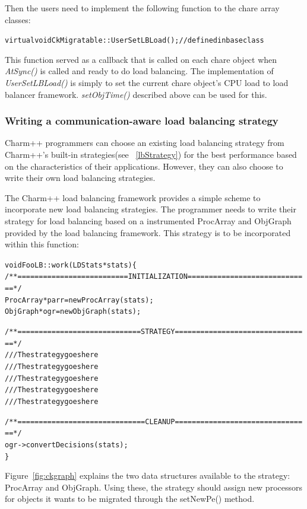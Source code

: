 Then the users need to implement the following function to the chare array
classes:

\begin{alltt}
   virtual void CkMigratable::UserSetLBLoad();      // defined in base class
\end{alltt}

This function served as a callback that is called on each chare object when
{\em AtSync()} is called and ready to do load balancing. The implementation of
{\em UserSetLBLoad()} is simply to set the current chare object's CPU load to
load balancer framework. {\em setObjTime()} described above can be used for
this.

\subsubsection{Writing a communication-aware load balancing strategy}

Charm++ programmers can choose an existing load balancing strategy from
Charm++'s built-in strategies(see ~\ref{lbStrategy}) for the best performance
based on the characteristics of their applications. However, they can also
choose to write their own load balancing strategies.

The Charm++ load balancing framework provides a simple scheme to incorporate
new load balancing strategies. The programmer needs to write their strategy for
load balancing based on a instrumented ProcArray and ObjGraph provided by the
load balancing framework. This strategy is to be incorporated within this
function:

\begin{alltt}
void FooLB::work(LDStats *stats) \{
  /** ========================== INITIALIZATION ============================= */
  ProcArray *parr = new ProcArray(stats);
  ObjGraph *ogr = new ObjGraph(stats);

  /** ============================= STRATEGY ================================ */
  /// The strategy goes here
  /// The strategy goes here
  /// The strategy goes here
  /// The strategy goes here
  /// The strategy goes here

  /** ============================== CLEANUP ================================ */
  ogr->convertDecisions(stats);
\}
\end{alltt}

Figure~\ref{fig:ckgraph} explains the two data structures available to the
strategy: ProcArray and ObjGraph. Using these, the strategy should assign new
processors for objects it wants to be migrated through the setNewPe() method.

